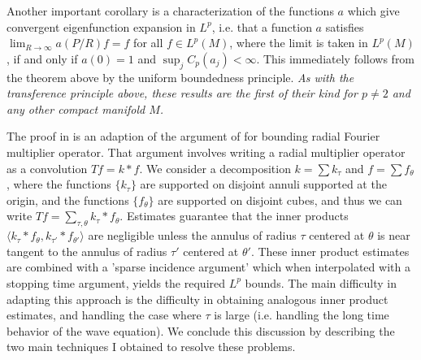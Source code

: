 \documentclass[11pt]{article}
\begin{document}
Another important corollary is a characterization of the functions $a$ which give convergent eigenfunction expansion in $L^p$, i.e. that a function $a$ satisfies $\lim_{R \to \infty} a(P/R) f = f$ for all $f \in L^p(M)$, where the limit is taken in $L^p(M)$, if and only if $a(0) = 1$ and $\sup_j C_p(a_j) < \infty$. This immediately follows from the theorem above by the uniform boundedness principle. \emph{As with the transference principle above, these results are the first of their kind for $p \neq 2$ and any other compact manifold $M$.}

The proof in \cite{DensonCharacterization} is an adaption of the argument of \cite{HeoNazarovSeeger} for bounding radial Fourier multiplier operator. That argument involves writing a radial multiplier operator as a convolution $Tf = k * f$. We consider a decomposition $k = \sum k_\tau$ and $f = \sum f_\theta$, where the functions $\{ k_\tau \}$ are supported on disjoint annuli supported at the origin, and the functions $\{ f_\theta \}$ are supported on disjoint cubes, and thus we can write $T f = \sum_{\tau,\theta} k_\tau * f_\theta$. Estimates guarantee that the inner products $\langle k_\tau * f_\theta, k_{\tau'} * f_{\theta'} \rangle$ are negligible unless the annulus of radius $\tau$ centered at $\theta$ is near tangent to the annulus of radius $\tau'$ centered at $\theta'$. These inner product estimates are combined with a 'sparse incidence argument' which when interpolated with a stopping time argument, yields the required $L^p$ bounds. The main difficulty in adapting this approach is the difficulty in obtaining analogous inner product estimates, and handling the case where $\tau$ is large (i.e. handling the long time behavior of the wave equation). We conclude this discussion by describing the two main techniques I obtained to resolve these problems.

\end{document}
